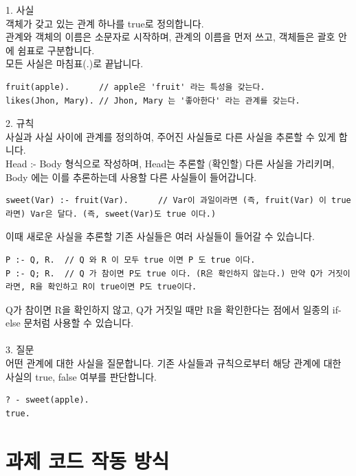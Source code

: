 \documentclass{article}
\begin{document}
1. 사실\\
\quad 객체가 갖고 있는 관계 하나를 true로 정의합니다.\\
관계와 객체의 이름은 소문자로 시작하며, 관계의 이름을 먼저 쓰고, 객체들은 괄호 안에 쉼표로 구분합니다.\\
모든 사실은 마침표(.)로 끝납니다.\\
\begin{verbatim}
fruit(apple).      // apple은 'fruit' 라는 특성을 갖는다.
likes(Jhon, Mary). // Jhon, Mary 는 '좋아한다' 라는 관계를 갖는다.
\end{verbatim}
2. 규칙\\
사실과 사실 사이에 관계를 정의하여, 주어진 사실들로 다른 사실을 추론할 수 있게 합니다.\\
Head :- Body 형식으로 작성하며, Head는 추론할 (확인할) 다른 사실을 가리키며, Body 에는 이를 추론하는데 사용할 다른 사실들이 들어갑니다.\\
\begin{verbatim}
sweet(Var) :- fruit(Var).      // Var이 과일이라면 (즉, fruit(Var) 이 true 라면) Var은 달다. (즉, sweet(Var)도 true 이다.)
\end{verbatim}
이때 새로운 사실을 추론할 기존 사실들은 여러 사실들이 들어갈 수 있습니다.\\
\begin{verbatim}
P :- Q, R.  // Q 와 R 이 모두 true 이면 P 도 true 이다.
P :- Q; R.  // Q 가 참이면 P도 true 이다. (R은 확인하지 않는다.) 만약 Q가 거짓이라면, R을 확인하고 R이 true이면 P도 true이다.
\end{verbatim}
Q가 참이면 R을 확인하지 않고, Q가 거짓일 때만 R을 확인한다는 점에서 일종의 if-else 문처럼 사용할 수 있습니다.\\\\
3. 질문\\
어떤 관계에 대한 사실을 질문합니다. 기존 사실들과 규칙으로부터 해당 관계에 대한 사실의 true, false 여부를 판단합니다.
\begin{verbatim}
? - sweet(apple).
true.
\end{verbatim}


\section{과제 코드 작동 방식}
\end{document}
